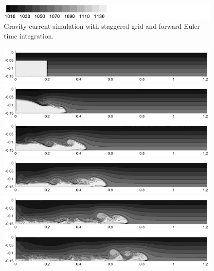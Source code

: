 \begin{figure}[htbp]
\begin{center}
\includegraphics[scale=0.55]{../figures/Staggered/Fig9case/label.png}
    \caption{Gravity current simulation with staggered grid and forward Euler time integration.}
    \label{fig:060519b-Euler-dt-000234375-280-120}
  \end{center}
\end{figure}

\begin{figure}[htbp]
  \begin{center}    \includegraphics[scale=0.55]{../figures/Staggered/Fig9case/060518c-RK4-dt-0009375-280-120/01.png}    \includegraphics[scale=0.55]{../figures/Staggered/Fig9case/060518c-RK4-dt-0009375-280-120/02.png}
\includegraphics[scale=0.55]{../figures/Staggered/Fig9case/060518c-RK4-dt-0009375-280-120/03.png}
\includegraphics[scale=0.55]{../figures/Staggered/Fig9case/060518c-RK4-dt-0009375-280-120/04.png}    \includegraphics[scale=0.55]{../figures/Staggered/Fig9case/060518c-RK4-dt-0009375-280-120/05.png}
\includegraphics[scale=0.55]{../figures/Staggered/Fig9case/060518c-RK4-dt-0009375-280-120/06.png}

\end{center}
\end{figure}
